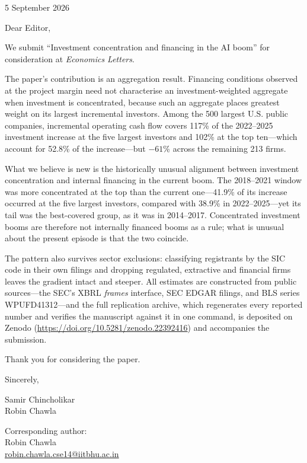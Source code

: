 \documentclass[11pt]{article}
\begin{document}
\hfill 5 September 2026

\medskip
Dear Editor,

We submit ``Investment concentration and financing in the AI boom'' for consideration at
\emph{Economics Letters}.

The paper's contribution is an aggregation result. Financing conditions observed at the project
margin need not characterise an investment-weighted aggregate when investment is concentrated,
because such an aggregate places greatest weight on its largest incremental investors. Among the
500 largest U.S. public companies, incremental operating cash flow covers 117\% of the 2022--2025
investment increase at the five largest investors and 102\% at the top ten---which account for
52.8\% of the increase---but $-61$\% across the remaining 213 firms.

What we believe is new is the historically unusual alignment between investment concentration and
internal financing in the current boom. The 2018--2021 window was more concentrated at the top than
the current one---41.9\% of its increase occurred at the five largest investors, compared with
38.9\% in 2022--2025---yet its tail was the best-covered group, as it was in 2014--2017.
Concentrated investment booms are therefore not internally financed booms as a rule; what is
unusual about the present episode is that the two coincide.

The pattern also survives sector exclusions: classifying registrants by the SIC code in their own
filings and dropping regulated, extractive and financial firms leaves the gradient intact and
steeper. All estimates are constructed from public sources---the SEC's XBRL \emph{frames}
interface, SEC EDGAR filings, and BLS series WPUFD41312---and the full replication archive, which
regenerates every reported number and verifies the manuscript against it in one command, is
deposited on Zenodo (\url{https://doi.org/10.5281/zenodo.22392416}) and accompanies the
submission.

Thank you for considering the paper.

\bigskip
Sincerely,

\medskip
Samir Chincholikar\\
Robin Chawla

\medskip
Corresponding author:\\
Robin Chawla\\
\url{robin.chawla.cse14@iitbhu.ac.in}
\end{document}
